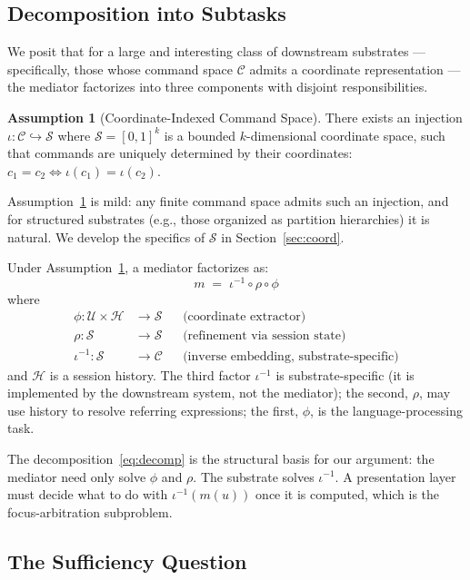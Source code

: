 \documentclass[11pt,twocolumn,a4paper]{article}
\theoremstyle{definition}
\newtheorem{assumption}[theorem]{Assumption}
\theoremstyle{remark}
\newcommand{\Cc}{\mathcal{C}}
\newcommand{\Sc}{\mathcal{S}}
\newcommand{\Uc}{\mathcal{U}}
\begin{document}
\subsection{Decomposition into Subtasks}

We posit that for a large and interesting class of downstream substrates --- specifically, those whose command space $\Cc$ admits a coordinate representation --- the mediator factorizes into three components with disjoint responsibilities.

\begin{assumption}[Coordinate-Indexed Command Space]
\label{assum:coord}
There exists an injection $\iota: \Cc \hookrightarrow \Sc$ where $\Sc = [0,1]^k$ is a bounded $k$-dimensional coordinate space, such that commands are uniquely determined by their coordinates: $c_1 = c_2 \iff \iota(c_1) = \iota(c_2)$.
\end{assumption}

Assumption~\ref{assum:coord} is mild: any finite command space admits such an injection, and for structured substrates (e.g., those organized as partition hierarchies) it is natural. We develop the specifics of $\Sc$ in Section~\ref{sec:coord}.

Under Assumption~\ref{assum:coord}, a mediator factorizes as:
\begin{equation}
\label{eq:decomp}
m \;=\; \iota^{-1} \circ \rho \circ \phi
\end{equation}
where
\begin{align*}
\phi: \Uc \times \mathcal{H} &\to \Sc & &\text{(coordinate extractor)} \\
\rho: \Sc &\to \Sc & &\text{(refinement via session state)} \\
\iota^{-1}: \Sc &\to \Cc & &\text{(inverse embedding, substrate-specific)}
\end{align*}
and $\mathcal{H}$ is a session history. The third factor $\iota^{-1}$ is substrate-specific (it is implemented by the downstream system, not the mediator); the second, $\rho$, may use history to resolve referring expressions; the first, $\phi$, is the language-processing task.

The decomposition~\eqref{eq:decomp} is the structural basis for our argument: the mediator need only solve $\phi$ and $\rho$. The substrate solves $\iota^{-1}$. A presentation layer must decide what to do with $\iota^{-1}(m(u))$ once it is computed, which is the focus-arbitration subproblem.

\subsection{The Sufficiency Question}
\end{document}
